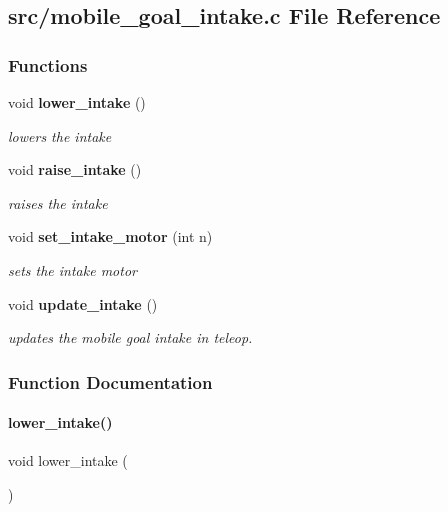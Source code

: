 \subsection{src/mobile\+\_\+goal\+\_\+intake.c File Reference}
\label{mobile__goal__intake_8c}
\subsubsection*{Functions}
\begin{DoxyCompactItemize}
\item 
void \textbf{ lower\+\_\+intake} ()
\begin{DoxyCompactList}\small\item\em lowers the intake \end{DoxyCompactList}\item 
void \textbf{ raise\+\_\+intake} ()
\begin{DoxyCompactList}\small\item\em raises the intake \end{DoxyCompactList}\item 
void \textbf{ set\+\_\+intake\+\_\+motor} (int n)
\begin{DoxyCompactList}\small\item\em sets the intake motor \end{DoxyCompactList}\item 
void \textbf{ update\+\_\+intake} ()
\begin{DoxyCompactList}\small\item\em updates the mobile goal intake in teleop. \end{DoxyCompactList}\end{DoxyCompactItemize}


\subsubsection{Function Documentation}
\mbox{\label{mobile__goal__intake_8c_aef03134014e51a6a90dd3824f09f4d6c}} 
\paragraph{lower\+\_\+intake()}
{\footnotesize\ttfamily void lower\+\_\+intake (\begin{DoxyParamCaption}{ }\end{DoxyParamCaption})}



